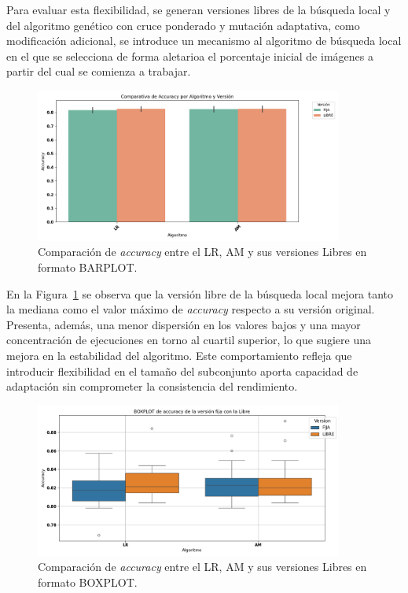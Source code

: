 Para evaluar esta flexibilidad, se generan versiones libres de la búsqueda local y del algoritmo genético con cruce ponderado y mutación adaptativa,
como modificación adicional, se introduce un mecanismo al algoritmo de búsqueda local
en el que se selecciona de forma aletarioa el porcentaje inicial de imágenes a partir del cual se comienza a trabajar.


\begin{figure}[htp]
    \centering
    \includegraphics[width=0.9\textwidth]{imagenes/evaluaciones/libres/barplot_por_algoritmo}
    \caption{Comparación de \textit{accuracy} entre el LR, AM y sus versiones Libres en formato BARPLOT.}
    \label{fig:barplot_por_algoritmo-libres}
\end{figure}

En la Figura~\ref{fig:barplot_por_algoritmo-libres} se observa que la versión libre de la búsqueda local mejora tanto la mediana
como el valor máximo de \textit{accuracy} respecto a su versión original.
Presenta, además, una menor dispersión en los valores bajos y una mayor concentración de ejecuciones en torno al cuartil superior,
lo que sugiere una mejora en la estabilidad del algoritmo.
Este comportamiento refleja que introducir flexibilidad en el tamaño del subconjunto aporta capacidad de adaptación sin comprometer la consistencia del rendimiento.


\begin{figure}[htp]
    \centering
    \includegraphics[width=0.9\textwidth]{imagenes/evaluaciones/libres/boxplot_por_algoritmo}
    \caption{Comparación de \textit{accuracy} entre el LR, AM y sus versiones Libres en formato BOXPLOT.}
    \label{fig:boxplot_por_algoritmo-libres}
\end{figure}

